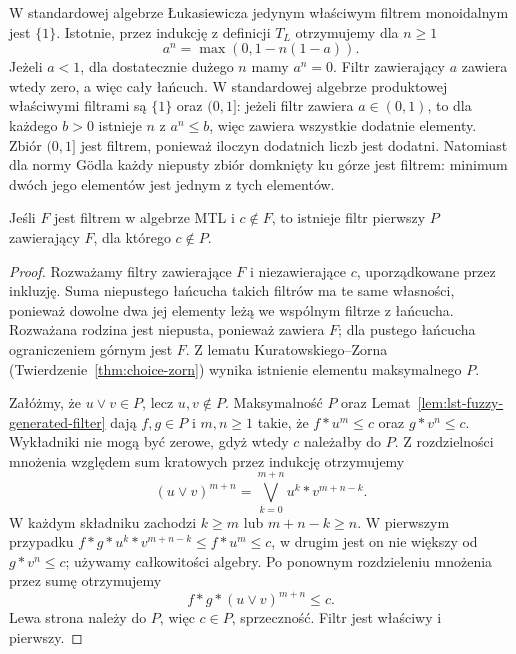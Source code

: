\begin{przyklad}
\label{ex:ncl-standard-filters}
W standardowej algebrze Łukasiewicza jedynym właściwym
filtrem monoidalnym jest $\{1\}$. Istotnie, przez indukcję
z definicji $T_L$ otrzymujemy dla $n\geq1$
\[
 a^n=\max(0,1-n(1-a)).
\]
Jeżeli $a<1$, dla dostatecznie dużego $n$ mamy $a^n=0$.
Filtr zawierający $a$ zawiera wtedy zero, a więc cały
łańcuch. W standardowej algebrze produktowej właściwymi
filtrami są $\{1\}$ oraz $(0,1]$: jeżeli filtr zawiera
$a\in(0,1)$, to dla każdego $b>0$ istnieje $n$ z $a^n\leq b$,
więc zawiera wszystkie dodatnie elementy. Zbiór $(0,1]$
jest filtrem, ponieważ iloczyn dodatnich liczb jest dodatni.
Natomiast dla normy Gödla każdy niepusty zbiór domknięty
ku górze jest filtrem: minimum dwóch jego elementów
jest jednym z tych elementów.
\end{przyklad}

\begin{twierdzenie}
\label{thm:lst-fuzzy-prime-separation}
Jeśli $F$ jest filtrem w algebrze MTL i $c\notin F$, to istnieje
filtr pierwszy $P$ zawierający $F$, dla którego $c\notin P$.
\end{twierdzenie}
\begin{proof}
Rozważamy filtry zawierające $F$ i niezawierające $c$, uporządkowane
przez inkluzję. Suma niepustego łańcucha takich filtrów ma te same
własności, ponieważ dowolne dwa jej elementy leżą we wspólnym
filtrze z łańcucha. Rozważana rodzina jest niepusta, ponieważ zawiera $F$;
dla pustego łańcucha ograniczeniem górnym jest $F$.
Z lematu Kuratowskiego--Zorna (Twierdzenie~\ref{thm:choice-zorn})
wynika istnienie elementu maksymalnego $P$.

Załóżmy, że $u\vee v\in P$, lecz $u,v\notin P$.
Maksymalność $P$ oraz Lemat~\ref{lem:lst-fuzzy-generated-filter}
dają $f,g\in P$ i $m,n\geq1$ takie, że
$f*u^m\leq c$ oraz $g*v^n\leq c$. Wykładniki nie mogą być
zerowe, gdyż wtedy $c$ należałby do $P$.
Z rozdzielności mnożenia względem sum kratowych przez indukcję
otrzymujemy
\[
 (u\vee v)^{m+n}=\bigvee_{k=0}^{m+n} u^k*v^{m+n-k}.
\]
W każdym składniku zachodzi $k\geq m$ lub $m+n-k\geq n$.
W pierwszym przypadku
$f*g*u^k*v^{m+n-k}\leq f*u^m\leq c$, w drugim jest on
nie większy od $g*v^n\leq c$; używamy całkowitości algebry.
Po ponownym rozdzieleniu mnożenia przez sumę otrzymujemy
\[
 f*g*(u\vee v)^{m+n}\leq c.
\]
Lewa strona należy do $P$, więc $c\in P$, sprzeczność.
Filtr jest właściwy i pierwszy.
\end{proof}

